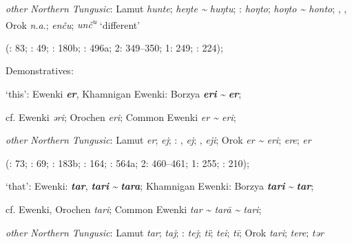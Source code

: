 \documentclass[output=paper,colorlinks,citecolor=brown]{langscibook}
\begin{document}
\begin{xlist}
\begin{xlist}
    \textit{other Northern Tungusic}: Lamut \textit{hunte};  \textit{heŋte {\textasciitilde} huŋtu}; \textit{}:  \textit{hoŋto};  \textit{hoŋto {\textasciitilde} honto}; , , Orok \textit{n.a}.;  \textit{enču};  \textit{unč\textsuperscript{u}} ‘different’
    
    (\citealt{Castrén1856}: 83; \citealt{Janhunen1991}: 49; \citealt{Dorji1998}: 180b; \citealt{Vasilevic1958}: 496a; \citealt{Cincius1975B} 2: 349--350; \citealt{Hauer1952} 1: 249; \citealt{Zikmundová2013a}: 224);

\end{xlist}


    \ex Demonstratives:

\begin{xlist}
    \ex ‘this’:  Ewenki \textbf{\textit{er}}, Khamnigan Ewenki: Borzya \textbf{\textit{eri}} \textit{{\textasciitilde}} \textbf{\textit{er}};

    cf.  Ewenki \textit{ǝri}; Orochen \textit{eri};  Common Ewenki \textit{er {\textasciitilde} eri};

    \textit{other Northern Tungusic}: Lamut \textit{er};  \textit{ej}; \textit{}: ,  \textit{ej}; ,  \textit{eji}; Orok \textit{er {\textasciitilde} eri};  \textit{ere};  \textit{er}
    
    (\citealt{Castrén1856}: 73; \citealt{Janhunen1991}: 69; \citealt{Dorji1998}: 183b; \citealt{Chaoke2014a}: 164; \citealt{Vasilevic1958}: 564a; \citealt{Cincius1975B} 2: 460--461; \citealt{Hauer1952} 1: 255; \citealt{Zikmundová2013a}: 210);

    \ex ‘that’:  Ewenki:  \textbf{\textit{tar}},  \textbf{\textit{tari}} \textit{{\textasciitilde}} \textbf{\textit{tara}}; Khamnigan Ewenki: Borzya \textbf{\textit{tari}} \textit{{\textasciitilde}} \textbf{\textit{tar}};

    cf.  Ewenki, Orochen \textit{tari};  Common Ewenki \textit{tar {\textasciitilde} tarā {\textasciitilde} tari};

    \textit{other Northern Tungusic}: Lamut \textit{tar};  \textit{taj}; \textit{}:  \textit{tej};  \textit{tï};  \textit{tei};  \textit{tī}; Orok \textit{tari};  \textit{tere};  \textit{tǝr}
    

\end{xlist}
\end{xlist}
\end{document}
